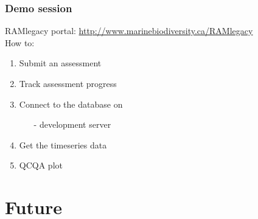 \begin{frame}
\frametitle{Demo session}
RAMlegacy portal: \url{http://www.marinebiodiversity.ca/RAMlegacy}\\
\vspace{.5cm}
How to:
\begin{enumerate}
\item Submit an assessment
\item Track assessment progress
\item Connect to the database on
\begin{itemize}
\item[-] development server
\end{itemize}
\item Get the timeseries data
\item QCQA plot
\end{enumerate}
\end{frame}
\begin{comment}
\begin{frame}
\frametitle{Avoiding the pre-release snapshot}
\begin{description}
\item[Snaphot:]{A once-off, static copy of the database content}
\end{description}
Assessments continually being entered\\
Data errors are likely (snapshot still has errors)\\
Lacks reproducibility (database moves on)\\
\vspace{.5cm}
\begin{description}
\item[Live data:]{Feed directly from database to analytical software}
\end{description}
Analysis can be re-run from current version of the database \\
All researchers working from same page\\
Uses all available assessments\\
Data corrections ran at source
\end{frame}
\end{comment}

\section{Future}

